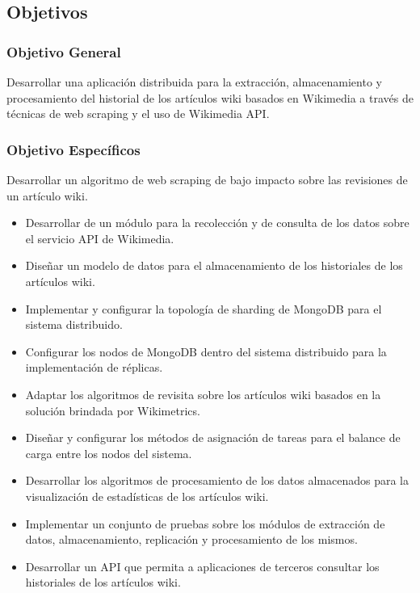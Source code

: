 \subsection{Objetivos}

\subsubsection{Objetivo General}

Desarrollar una aplicación distribuida para la extracción, almacenamiento y
procesamiento del historial de los artículos wiki basados en Wikimedia a través de
técnicas de web scraping y el uso de Wikimedia API.

\subsubsection{Objetivo Específicos}

Desarrollar un algoritmo de web scraping de bajo impacto sobre las revisiones
de un artículo wiki.

\begin{itemize}
\item Desarrollar de un módulo para la recolección y de consulta de los datos sobre el
servicio API de Wikimedia.

\item Diseñar un modelo de datos para el almacenamiento de los historiales de los
artículos wiki.

\item Implementar y configurar la topología de sharding de MongoDB para el sistema
distribuido.

\item Configurar los nodos de MongoDB dentro del sistema distribuido para la
implementación de réplicas.

\item Adaptar los algoritmos de revisita sobre los artículos wiki basados en la solución
brindada por Wikimetrics.

\item Diseñar y configurar los métodos de asignación de tareas para el balance de
carga entre los nodos del sistema.

\item Desarrollar los algoritmos de procesamiento de los datos almacenados para la
visualización de estadísticas de los artículos wiki.

\item Implementar un conjunto de pruebas sobre los módulos de extracción de datos,
almacenamiento, replicación y procesamiento de los mismos.

\item Desarrollar un API que permita a aplicaciones de terceros consultar los
historiales de los artículos wiki.

\end{itemize}